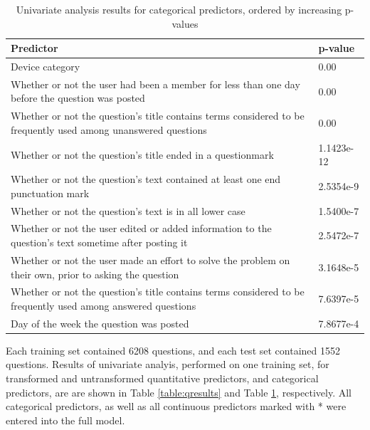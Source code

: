 \documentclass{article}
\begin{document}
\begin{table}[ht]
\centering
\caption{Univariate analysis results for categorical predictors, ordered by increasing p-values} 
\begin{tabular}{|p{12cm}|p{2cm}|}
  \hline
 Predictor & p-value \\ 
  \hline \hline
  Device category & 0.00 \\
  \hline
  Whether or not the user had been a member for less than one day before the question was posted & 0.00 \\ 
  \hline
  Whether or not the question's title contains terms considered to be frequently used among unanswered questions & 0.00 \\ 
  \hline
  Whether or not the question's title ended in a questionmark & 1.1423e-12 \\ 
  \hline
  Whether or not the question's text contained at least one end punctuation mark & 2.5354e-9 \\ 
  \hline
  Whether or not the question's text is in all lower case & 1.5400e-7 \\ 
  \hline
  Whether or not the user edited or added information to the question's text sometime after posting it & 2.5472e-7 \\ 
  \hline
  Whether or not the user made an effort to solve the problem on their own, prior to asking the question & 3.1648e-5 \\
  \hline
  Whether or not the question's title contains terms considered to be frequently used among answered questions & 7.6397e-5 \\ 
  \hline
  Day of the week the question was posted & 7.8677e-4 \\ 
   \hline
\end{tabular}
\label{table:cresults}
\end{table}


Each training set contained 6208 questions, and each test set contained 1552 questions. Results of univariate analyis, performed on one training set, for transformed and untransformed quantitative predictors, and categorical predictors, are are shown in Table \ref{table:qresults} and Table \ref{table:cresults}, respectively. All categorical predictors, as well as all continuous predictors marked with * were entered into the full model.
\end{document}
